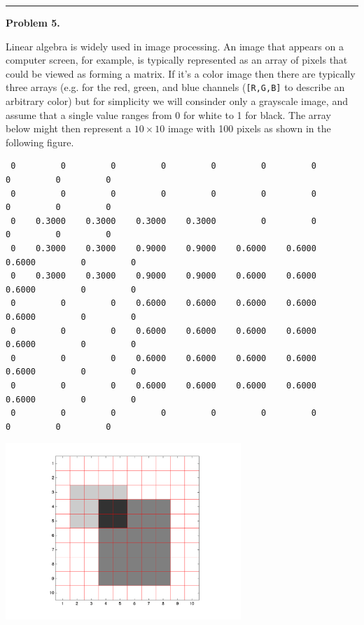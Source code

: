 \documentclass[10pt]{article}
\begin{document}



\vskip 1cm
\hrule
{\bf Problem 5.}

Linear algebra is widely used in image processing.  An
image that appears on a computer screen, for example, is typically
represented as an array of pixels that could be viewed as forming
a matrix.  If it's a color image then there are typically three
arrays (e.g. for the red, green, and blue channels ({\tt [R,G,B]}
to describe an arbitrary color) but for simplicity we will consinder
only a grayscale image, and assume that a single value ranges from
0 for white to 1 for black.  The array below might then represent
a $10 \times 10$ image with 100 pixels as shown in the following figure.

\begin{verbatim} 
 0         0         0         0         0         0         0         0         0         0
 0         0         0         0         0         0         0         0         0         0
 0    0.3000    0.3000    0.3000    0.3000         0         0         0         0         0
 0    0.3000    0.3000    0.9000    0.9000    0.6000    0.6000    0.6000         0         0
 0    0.3000    0.3000    0.9000    0.9000    0.6000    0.6000    0.6000         0         0
 0         0         0    0.6000    0.6000    0.6000    0.6000    0.6000         0         0
 0         0         0    0.6000    0.6000    0.6000    0.6000    0.6000         0         0
 0         0         0    0.6000    0.6000    0.6000    0.6000    0.6000         0         0
 0         0         0    0.6000    0.6000    0.6000    0.6000    0.6000         0         0
 0         0         0         0         0         0         0         0         0         0
\end{verbatim} 

\centerline{\includegraphics[width=3.5in]{image1.png}}
\end{document}
